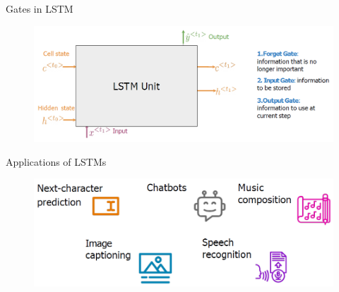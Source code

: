\begin{frame}{Gates in LSTM}
    \begin{figure}
        \centering
        \includegraphics[width=\linewidth, height=0.9\textheight,keepaspectratio]{images/nlp/lstm-gates.png}
    \end{figure}
\end{frame}

\begin{frame}{Applications of LSTMs}
    \begin{figure}
        \centering
        \includegraphics[width=\linewidth, height=0.9\textheight,keepaspectratio]{images/nlp/lstm-application.png}
    \end{figure}
\end{frame}